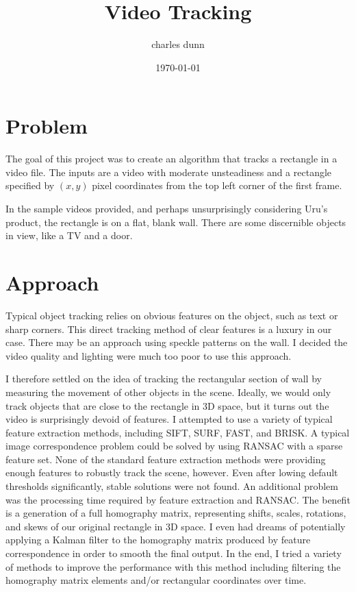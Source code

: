 \documentclass{article}
\title{Video Tracking}
\author{charles dunn}
\date{\today}
\begin{document}
\maketitle

\section{Problem}

The goal of this project was to create an algorithm that tracks a rectangle in a video file. The inputs are a video with moderate unsteadiness and a rectangle specified by $(x,y)$ pixel coordinates from the top left corner of the first frame.

In the sample videos provided, and perhaps unsurprisingly considering Uru's product, the rectangle is on a flat, blank wall. There are some discernible objects in view, like a TV and a door.

\section{Approach}

Typical object tracking relies on obvious features on the object, such as text or sharp corners. This direct tracking method of clear features is a luxury in our case. There may be an approach using speckle patterns on the wall. I decided the video quality and lighting were much too poor to use this approach.

I therefore settled on the idea of tracking the rectangular section of wall by measuring the movement of other objects in the scene. Ideally, we would only track objects that are close to the rectangle in 3D space, but it turns out the video is surprisingly devoid of features. I attempted to use a variety of typical feature extraction methods, including SIFT, SURF, FAST, and BRISK. A typical image correspondence problem could be solved by using RANSAC with a sparse feature set. None of the standard feature extraction methods were providing enough features to robustly track the scene, however. Even after lowing default thresholds significantly, stable solutions were not found. An additional problem was the processing time required by feature extraction and RANSAC. The benefit is a generation of a full homography matrix, representing shifts, scales, rotations, and skews of our original rectangle in 3D space. I even had dreams of potentially applying a Kalman filter to the homography matrix produced by feature correspondence in order to smooth the final output. In the end, I tried a variety of methods to improve the performance with this method including filtering the homography matrix elements and/or rectangular coordinates over time.
\end{document}
